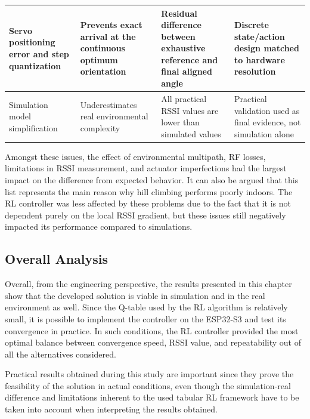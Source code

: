 \begin{longtable}{|
>{\raggedright\arraybackslash}p{3cm}|
>{\raggedright\arraybackslash}p{3.2cm}|
>{\raggedright\arraybackslash}p{3cm}|
>{\raggedright\arraybackslash}p{4.45cm}|}
\hline
Servo positioning error and step quantization & Prevents exact arrival at the continuous optimum orientation & Residual difference between exhaustive reference and final aligned angle & Discrete state/action design matched to hardware resolution \\
\hline
Simulation model simplification & Underestimates real environmental complexity & All practical RSSI values are lower than simulated values & Practical validation used as final evidence, not simulation alone \\
\hline
\end{longtable}

Amongst these issues, the effect of environmental multipath, RF losses, limitations in RSSI measurement, and actuator imperfections had the largest impact on the difference from expected behavior. It can also be argued that this list represents the main reason why hill climbing performs poorly indoors. The RL controller was less affected by these problems due to the fact that it is not dependent purely on the local RSSI gradient, but these issues still negatively impacted its performance compared to simulations.


\subsection{Overall Analysis}

Overall, from the engineering perspective, the results presented in this chapter show that the developed solution is viable in simulation and in the real environment as well. Since the Q-table used by the RL algorithm is relatively small, it is possible to implement the controller on the ESP32-S3 and test its convergence in practice. In such conditions, the RL controller provided the most optimal balance between convergence speed, RSSI value, and repeatability out of all the alternatives considered.

Practical results obtained during this study are important since they prove the feasibility of the solution in actual conditions, even though the simulation-real difference and limitations inherent to the used tabular RL framework have to be taken into account when interpreting the results obtained.